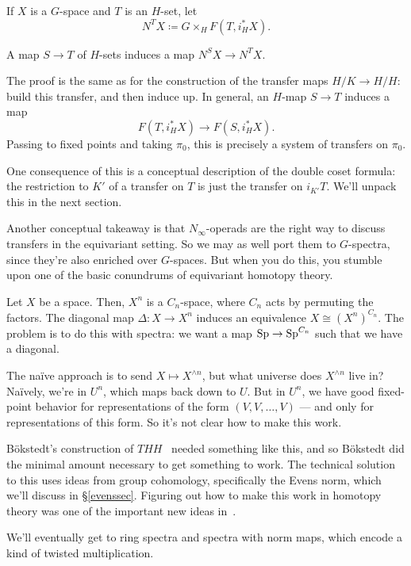 If $X$ is a $G$-space and $T$ is an $H$-set, let
\[N^TX\coloneqq G\times_H F(T, i_H^*X).\]
\begin{lem}
A map $S\to T$ of $H$-sets induces a map $N^S X\to N^T X$.
\end{lem}
The proof is the same as for the construction of the transfer maps $H/K\to H/H$: build this transfer, and then
induce up. In general, an $H$-map $S\to T$ induces a map
\[F(T, i_H^*X)\longrightarrow F(S, i_H^*X).\]
Passing to fixed points and taking $\pi_0$, this is precisely a system of transfers on $\pi_0$.
\begin{rem}
One consequence of this is a conceptual description of the double coset formula: the restriction to $K'$ of a
transfer on $T$ is just the transfer on $i_{K'}T$. We'll unpack this in the next section.
\end{rem}
Another conceptual takeaway is that $N_\infty$-operads are the right way to discuss transfers in the equivariant
setting. So we may as well port them to $G$-spectra, since they're also enriched over $G$-spaces. But when you do
this, you stumble upon one of the basic conundrums of equivariant homotopy theory.

Let $X$ be a space. Then, $X^n$ is a $C_n$-space, where $C_n$ acts by permuting the factors. The diagonal map
$\Delta\colon X\to X^n$ induces an equivalence $X\cong (X^n)^{C_n}$. The problem is to do this with spectra: we
want a map $\mathrm{Sp}\to\mathrm{Sp}^{C_n}$ such that we have a diagonal.

The naïve approach is to send $X\mapsto X^{\wedge n}$, but what universe does $X^{\wedge n}$ live in? Naïvely,
we're in $U^n$, which maps back down to $U$. But in $U^n$, we have good fixed-point behavior for representations of
the form $(V,V,\dotsc,V)$ --- and only for representations of this form. So it's not clear how to make this
work.

Bökstedt's construction of $\mathit{THH}$~\cite{Bokstedt} needed something like this, and so Bökstedt did the
minimal amount necessary to get something to work. The technical solution to this uses ideas from group cohomology,
specifically the Evens norm, which we'll discuss in \S\ref{evenssec}. Figuring out how to make this work in
homotopy theory was one of the important new ideas in~\cite{HHR}.

We'll eventually get to ring spectra and spectra with norm maps, which encode a kind of twisted multiplication.

